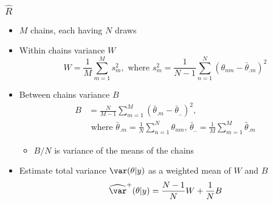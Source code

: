 \documentclass[10pt]{beamer}
\begin{document}
\begin{frame}

\frametitle{ $\widehat{R}$}

  \begin{itemize}
  \item $M$ chains, each having $N$ draws
  \item<2-> Within chains variance $W$
    \begin{equation*}
      W=\frac{1}{M}\sum_{m=1}^M s^2_m ,\text{ where }
      s^2_m=\frac{1}{N-1}\sum_{n=1}^N (\theta_{nm}-\bar{\theta}_{.m})^2
    \end{equation*}
  \item<3-> Between chains variance $B$
    \begin{align*}
      B&=\frac{N}{M-1}\sum_{m=1}^M
      (\bar{\theta}_{.m}-\bar{\theta}_{..})^2,\\
      &\text{ where } \bar{\theta}_{.m}=\frac{1}{N}\sum_{n=1}^N \theta_{nm}, \,
      \bar{\theta}_{..}=\frac{1}{M}\sum_{m=1}^M\bar{\theta}_{.m}
    \end{align*}
    \begin{itemize}
      \item<4-> $B/N$ is variance of the means of the chains
    \end{itemize}
    \vspace{2mm}
  \item<5-> Estimate total variance
    $\var(\theta|y)$ as a weighted mean of $W$ and $B$
    \begin{equation*}
      \widehat{\var}^{+}(\theta|y) = \frac{N-1}{N}W+\frac{1}{N}B
    \end{equation*}
  \end{itemize}

\end{frame}
\end{document}
